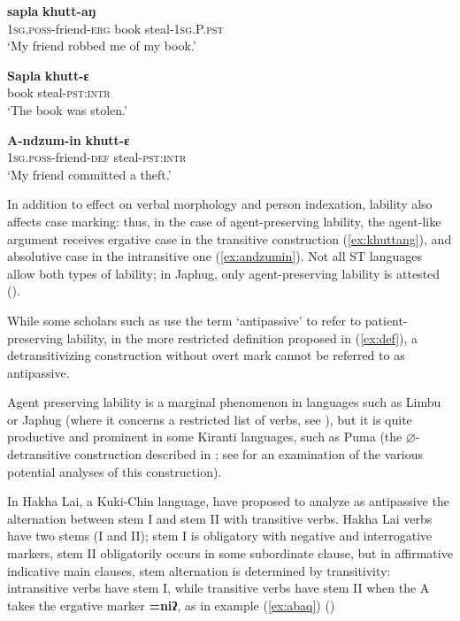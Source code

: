 \documentclass[oneside,a4paper,11pt]{article}
\newcommand{\ipa}[1]{{\phon\textbf{#1}}}
\begin{document}
\begin{exe}
\ex \label{ex:khuttang}
\gll \ipa{A-ndzum-ille}	\ipa{sapla}	\ipa{khutt-aŋ} \\
\textsc{1sg.poss}-friend-\textsc{erg} book steal-\textsc{1sg.P.pst} \\
\glt `My friend robbed me of my book.'
\end{exe}

\begin{exe}
\ex \label{ex:sapla}
\gll 
\ipa{Sapla}	\ipa{khutt-ɛ} \\
book steal-\textsc{pst:intr} \\
\glt `The book was stolen.'
\end{exe}

\begin{exe}
\ex \label{ex:andzumin}
\gll 
\ipa{A-ndzum-in}	\ipa{khutt-ɛ} \\
\textsc{1sg.poss}-friend-\textsc{def} steal-\textsc{pst:intr} \\
\glt `My friend committed a theft.'
\end{exe}
In addition to effect on verbal morphology and person indexation, lability also affects case marking: thus, in the case of agent-preserving lability, the agent-like argument receives ergative case in the transitive construction (\ref{ex:khuttang}), and absolutive case in the intransitive one (\ref{ex:andzumin}). Not all ST languages allow both types of lability; in Japhug, only agent-preserving lability is attested (\citealt[218]{jacques12demotion}).

 While some scholars such as \citet[359]{schackow15yakkha} use the term `antipassive' to refer to patient-preserving lability, in the more restricted definition proposed in (\ref{ex:def}), a detransitivizing construction without overt mark cannot be referred to as antipassive.

Agent preserving lability is a marginal phenomenon in languages such as Limbu or Japhug (where it concerns a restricted list of verbs, see \citealt[218]{jacques12demotion}), but it is quite productive and prominent in some Kiranti languages, such as Puma (the $\varnothing$-detransitive construction described in \citealt[9]{bickel07puma}; see \citealt{bickel11multivariate} for an examination of the various potential analyses of this construction).

In Hakha Lai, a Kuki-Chin language, \citet{kathol01alternations} have proposed to analyze as antipassive the alternation between stem I and stem II with transitive verbs.  Hakha Lai verbs have two stems (I and II); stem I is obligatory with negative and interrogative markers, stem II obligatorily occurs in some subordinate clause, but in affirmative indicative main clauses, stem alternation is determined by transitivity: intransitive verbs have stem I, while transitive verbs have stem II when the A takes the ergative marker \ipa{=niʔ}, as in example (\ref{ex:abaq}) (\citealt[413]{peterson03hakha})
\end{document}

